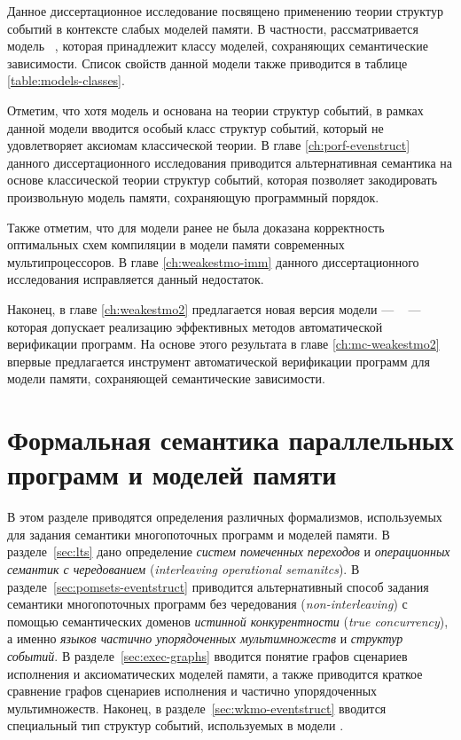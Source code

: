 Данное диссертационное исследование посвящено 
применению теории структур событий в контексте слабых моделей памяти. 
В частности, рассматривается модель \Wkm~\cite{Chakraborty-Vafeiadis:POPL19}, 
которая принадлежит классу моделей, сохраняющих семантические зависимости. 
Список свойств данной модели также приводится в таблице \ref{table:models-classes}.

Отметим, что хотя модель \Wkm и основана на 
теории структур событий, в рамках данной модели 
вводится особый класс структур событий, 
который не удовлетворяет аксиомам классической теории.
В главе \ref{ch:porf-evenstruct} данного диссертационного исследования 
приводится альтернативная семантика на основе 
классической теории структур событий,  
которая позволяет закодировать произвольную 
модель памяти, сохраняющую программный порядок.

Также отметим, что для модели \Wkm ранее не была 
доказана корректность оптимальных схем компиляции 
в модели памяти современных мультипроцессоров. 
В главе \ref{ch:weakestmo-imm} данного диссертационного исследования 
исправляется данный недостаток. 

Наконец, в главе \ref{ch:weakestmo2} предлагается новая версия модели \Wkm --- 
\WkmS~ --- которая допускает реализацию эффективных методов 
автоматической верификации программ.
На основе этого результата в главе \ref{ch:mc-weakestmo2} 
впервые предлагается инструмент 
автоматической верификации программ для модели памяти, 
сохраняющей семантические зависимости.  

\section{Формальная семантика параллельных программ и моделей памяти}

В этом разделе приводятся определения различных формализмов,
используемых для задания семантики многопоточных программ и моделей памяти.
В разделе~\ref{sec:lts} дано определение \emph{систем помеченных переходов}
и \emph{операционных семантик с чередованием} 
(\emph{interleaving operational semanitcs}).
В разделе~\ref{sec:pomsets-eventstruct} приводится альтернативный способ
задания семантики многопоточных программ без чередования 
(\emph{non-interleaving}) 
с помощью семантических доменов \emph{истинной конкурентности} 
(\emph{true concurrency}), а именно 
\emph{языков частично упорядоченных мультимножеств} и \emph{структур событий}.
В разделе~\ref{sec:exec-graphs} вводится понятие графов сценариев исполнения
и аксиоматических моделей памяти, а также приводится краткое сравнение
графов сценариев исполнения и частично упорядоченных мультимножеств.
Наконец, в разделе~\ref{sec:wkmo-eventstruct} вводится
специальный тип структур событий, используемых в модели \Wkm.


